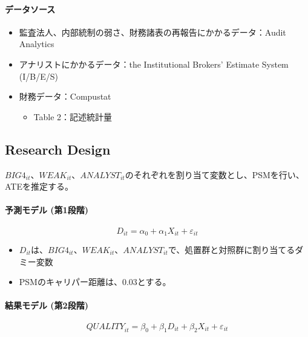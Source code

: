 \paragraph{データソース}

\begin{itemize}
 \item 監査法人、内部統制の弱さ、財務諸表の再報告にかかるデータ：Audit Analytics
 \item アナリストにかかるデータ：the Institutional Brokers’ Estimate System (I/B/E/S) 
 \item 財務データ：Compustat
  \begin{itemize}
   \item Table 2：記述統計量
  \end{itemize}
\end{itemize}

\subsection*{Research Design}

$\mathit{BIG}4_{it}$、$\mathit{WEAK}_{it}$、$\mathit{ANALYST}_{it}$のそれぞれを割り当て変数とし、PSMを行い、ATEを推定する。

\paragraph{予測モデル (第1段階) }

\begin{equation}
\mathit{D}_{it} = \alpha_0 + \alpha_1 \mathit{X}_{it} + \varepsilon_{it}
\end{equation}

\begin{itemize}
 \item $\mathit{D}_{it}$は、$\mathit{BIG}4_{it}$、$\mathit{WEAK}_{it}$、$\mathit{ANALYST}_{it}$で、処置群と対照群に割り当てるダミー変数
 \item PSMのキャリパー距離は、0.03とする。
\end{itemize}

\paragraph{結果モデル (第2段階) }

\begin{equation}
\mathit{QUALITY}_{it} = \beta_0 + \beta_1 \mathit{D}_{it} + \beta_2 \mathit{X}_{it} +\varepsilon_{it}
\end{equation}

